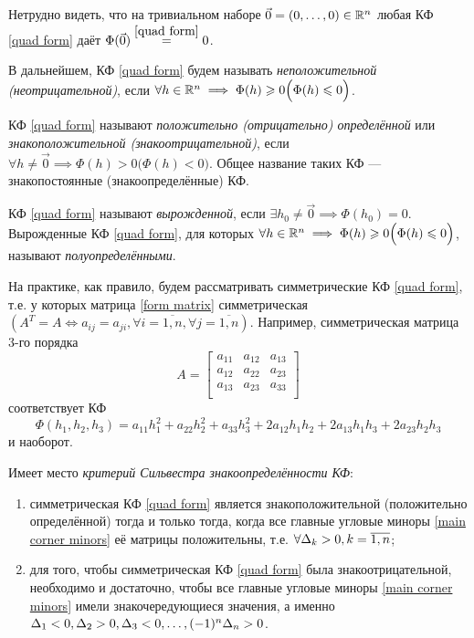 \documentclass[../../main.tex]{subfiles}
\begin{document}
	Нетрудно видеть, что на тривиальном наборе
	$\vec{0} = (0, \ldots, 0) \in \mathbb{R}^n$ любая КФ \eqref{quad form}
	даёт $\Phi(\vec{0}) \stk{quad form}{=} 0$.
	
	В дальнейшем, КФ \eqref{quad form} будем называть \emph{неположительной
	(неотрицательной)}, если $\forall h \in \mathbb{R}^n \implies
	\Phi(h) \geqslant 0
	\Big(\Phi(h) \leqslant 0\Big)$.
	
	КФ \eqref{quad form} называют \emph{положительно (отрицательно) определённой}
	или \emph{знакоположительной (знакоотрицательной)},
	если $\forall h \ne \vec{0} \implies \Phi(h) > 0 \Big(\Phi(h) < 0\Big)$.
	Общее название таких КФ --- знакопостоянные (знакоопределённые) КФ.
	
	КФ \eqref{quad form} называют \emph{вырожденной}, если
	$\exists h_0 \ne \vec{0} \implies \Phi(h_0) = 0$.
	Вырожденные КФ \eqref{quad form}, для которых
	$\forall h \in \mathbb{R}^n \implies \Phi(h) \geqslant 0
	\Big(\Phi(h) \leqslant 0\Big)$,
	называют \emph{полуопределёнными}.
	
	На практике, как правило, будем рассматривать симметрические КФ
	\eqref{quad form}, т.е. у которых матрица \eqref{form matrix} симметрическая
	$\left(A^T = A \iff a_{i j} = a_{j i},
	\forall i = \overline{1, n}, \forall j = \overline{1, n}\right)$.
	Например, симметрическая матрица 3-го порядка
	\[
		A =
		\begin{bmatrix}
			a_{1 1} & a_{1 2} & a_{1 3} \\
			a_{1 2} & a_{2 2} & a_{2 3} \\
			a_{1 3} & a_{2 3} & a_{3 3} \\
		\end{bmatrix}
	\]
	соответствует КФ
	\[
		\Phi(h_1, h_2, h_3)
		= a_{1 1} h_1^2 + a_{2 2} h_2^2 + a_{3 3} h_3^2
		+ 2 a_{1 2} h_1 h_2 + 2 a_{1 3} h_1 h_3 + 2 a_{2 3} h_2 h_3
	\]
	и наоборот.
	
	Имеет место \emph{критерий Сильвестра знакоопределённости КФ}:
	\begin{enumerate}
		\item
		симметрическая КФ \eqref{quad form} является знакоположительной
		(положительно определённой)
		тогда и только тогда, когда
		все главные угловые миноры \eqref{main corner minors} её матрицы
		положительны,
		т.е. $\forall \Delta_k > 0, k = \overline{1, n}$;
		
		\item
		для того, чтобы симметрическая КФ \eqref{quad form}
		была знакоотрицательной, необходимо и достаточно, чтобы все главные
		угловые миноры \eqref{main corner minors} имели знакочередующиеся
		значения, а именно $\Delta_1 < 0, \Delta_2 > 0, \Delta_3 < 0,
		\ldots, (-1)^n \Delta_n > 0$.
	\end{enumerate}
	
\end{document}

